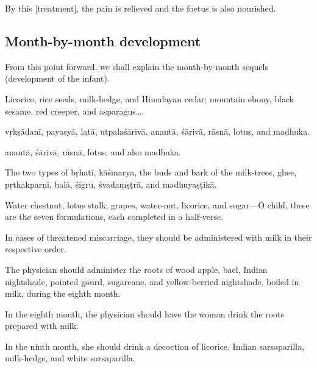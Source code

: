 \begin{translation}
\begin{tt}
By this [treatment], the pain is relieved and the foetus is also
nourished.


\subsection{Month-by-month development}

\item[58]

From this point forward, we shall explain the month-by-month sequels
(development of the infant).

\item[59]

Licorice, rice seeds, milk-hedge, and Himalayan cedar; mountain ebony,
black sesame, red creeper, and asparagus\ldots.

\item[60]

\gls{vṛkṣādanī}, \gls{payasyā}, \gls{latā}, \gls{utpalaśārivā}, \gls{anantā}, \gls{śārivā}, \gls{rāsnā}, lotus,
and \gls{madhuka}.

anantā, śārivā, rāsnā, lotus, and also madhuka.

\item[61]

The two types of \gls{bṛhatī}, \gls{kāśmarya}, the buds and bark of the milk-trees,
ghee, \gls{pṛthakparṇī}, \gls{balā}, \gls{śigru}, \gls{śvadaṃṣṭrā}, and \gls{madhuyaṣṭikā}.



\item[62]

Water chestnut, lotus stalk, grapes, water-nut, licorice, and sugar---O
child, these are the seven formulations, each completed in a
half-verse.

In cases of threatened miscarriage, they should be administered with
milk in their respective order.

\item[63]

The physician should administer the roots of wood apple, bael, Indian
nightshade, pointed gourd, sugarcane, and yellow-berried nightshade,
boiled in milk, during the eighth month.

In the eighth month, the physician should have the woman drink the roots
prepared with milk.

\item[64]

In the ninth month, she should drink a decoction of licorice, Indian
sarsaparilla, milk-hedge, and white sarsaparilla.


\end{tt}
\end{translation}
